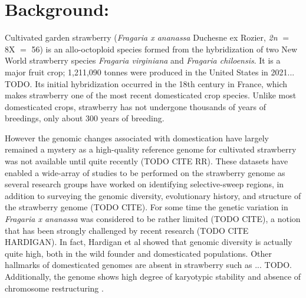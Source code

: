 \documentclass[fleqn,10pt]{olplainarticle}
\begin{document}
\flushbottom
\maketitle
\thispagestyle{empty}

\newpage




\section{Background:}
Cultivated garden strawberry (\textit{Fragaria x ananassa} Duchesne ex Rozier, \textit{2n} $=$ 8X $=$ 56) is an allo-octoploid species formed from the hybridization of two New World strawberry species \textit{Fragaria virginiana} and \textit{Fragaria chiloensis}.
It is a major fruit crop; 1,211,090 tonnes were produced in the United States in 2021... TODO.
Its initial hybridization occurred in the 18th century in France, which makes strawberry one of the most recent domesticated crop species.
Unlike most domesticated crops, strawberry has not undergone thousands of years of breedings, only about 300 years of breeding.


However the genomic changes associated with domestication have largely remained a mystery as a high-quality reference genome for cultivated strawberry was not available until quite recently \cite{Edger2019} (TODO CITE RR).
These datasets have enabled a wide-array of studies to be performed on the strawberry genome as several research groups have worked on identifying selective-sweep regions, in addition to surveying the genomic diversity, evolutionary history, and structure of the strawberry genome (TODO CITE).
For some time the genetic variation in \textit{Fragaria x ananassa} was considered to be rather limited (TODO CITE), a notion that has been strongly challenged by recent research (TODO CITE HARDIGAN).
In fact, Hardigan et al showed that genomic diversity is actually quite high, both in the wild founder and domesticated populations.
Other hallmarks of domesticated genomes are absent in strawberry such as ... TODO.
Additionally, the genome shows high degree of karyotypic stability and absence of chromosome restructuring \cite{Hardigan2020, Hardigan2021}.
\end{document}
